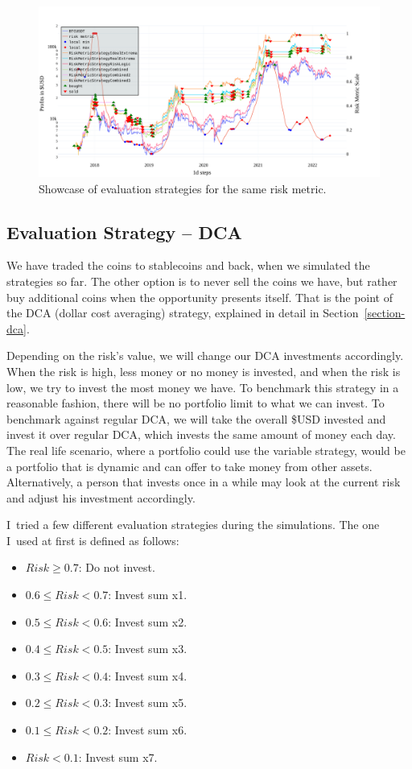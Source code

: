 \begin{figure}[!t]
    \centering
    \includegraphics[width=\columnwidth]{figures/combined-riskmetric.pdf}
    \caption{Showcase of evaluation strategies for the same risk metric.}
    \label{figure-combined-riskmetric}
\end{figure}

\subsection*{Evaluation Strategy -- DCA}
\label{subsection-eval-dca}
We have traded the coins to stablecoins and back, when we simulated the strategies so far. The other option is to never sell the coins we have, but rather buy additional coins when the opportunity presents itself. That is the point of the DCA (dollar cost averaging) strategy, explained in detail in Section~\ref{section-dca}.

Depending on the risk's value, we will change our DCA investments accordingly. When the risk is high, less money or no money is invested, and when the risk is low, we try to invest the most money we have. To benchmark this strategy in a reasonable fashion, there will be no portfolio limit to what we can invest. To benchmark against regular DCA, we will take the overall \$USD invested and invest it over regular DCA, which invests the same amount of money each day. The real life scenario, where a portfolio could use the variable strategy, would be a portfolio that is dynamic and can offer to take money from other assets. Alternatively, a person that invests once in a while may look at the current risk and adjust his investment accordingly.

I~tried a few different evaluation strategies during the simulations. The one I~used at first is defined as follows:
\begin{itemize}
    \item $Risk \ge  0.7$: Do not invest.
    \item $0.6 \le Risk < 0.7$: Invest sum x1.
    \item $0.5 \le Risk < 0.6$: Invest sum x2.
    \item $0.4 \le Risk < 0.5$: Invest sum x3.
    \item $0.3 \le Risk < 0.4$: Invest sum x4.
    \item $0.2 \le Risk < 0.3$: Invest sum x5.
    \item $0.1 \le Risk < 0.2$: Invest sum x6.
    \item $Risk < 0.1$: Invest sum x7.
\end{itemize}

